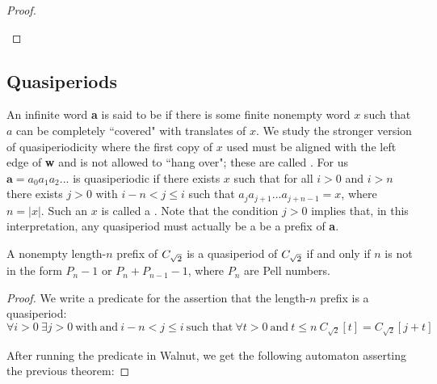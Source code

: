 \begin{proof}
\begin{figure}[h!]
\begin{minipage}{0.45\textwidth}
    \end{minipage}
\end{figure}
\end{proof}

\subsection{Quasiperiods}

An infinite word \textbf{a} is said to be  if there is some finite nonempty word $x$ such that $a$ can be completely ``covered" with translates of $x$. 
We study the stronger version of quasiperiodicity where the first copy of $x$ used must be aligned with the left edge of \textbf{w} and is not allowed to ``hang over"; these are called . 
For us $\mathbf{a} = a_{0}a_{1}a_{2}...$ is quasiperiodic if there exists $x$ such that for all $i>0$ and $i>n$ there exists $j>0$ with $i-n<j\leq i$ such that $a_{j}a_{j+1}...a_{j+n-1}=x$, where $n=|x|$. Such an $x$ is called a . 
Note that the condition $j>0$ implies that, in this interpretation, any quasiperiod must actually be a be a prefix of \textbf{a}.

\begin{theorem}
A nonempty length-$n$ prefix of $C_{\sqrt{2}}$ is a quasiperiod of $C_{\sqrt{2}}$ if and only if $n$ is not in the form $P_n - 1$ or $P_n + P_{n-1} - 1$, where $P_n$ are Pell numbers.
\end{theorem}

\begin{proof}
We write a predicate for the assertion that the length-$n$ prefix is a quasiperiod: 
\begin{equation*}\label{eqn:quasiperiod-def}
    \forall i>0 ~ \exists j > 0 ~ \text{with} ~ \text{and} ~ i-n<j\leq i ~ \text{such that} ~ \forall t>0 ~ \text{and} ~ t \leq n ~ C_{\sqrt{2}}[t] = C_{\sqrt{2}}[j+t]
\end{equation*}

After running the predicate in Walnut, we get the following automaton asserting the previous theorem:

\end{proof}

